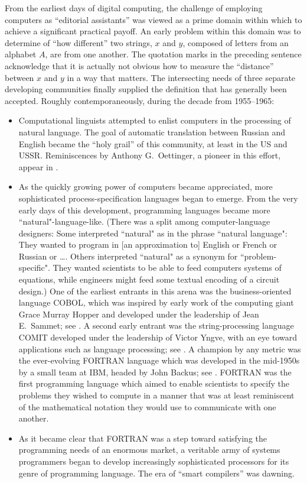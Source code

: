 From the earliest days of digital computing, the challenge of employing computers as ``editorial assistants'' was viewed as a prime domain within which to achieve a significant practical payoff.  An early problem within this domain was to determine of ``how different'' two strings, $x$ and $y$, composed of letters from an alphabet $A$, are from one another.  The quotation marks in the preceding sentence acknowledge that it is actually not obvious how to measure the ``distance'' between $x$ and $y$ in a way that matters.  The intersecting needs of three separate developing communities finally supplied the definition that has generally been accepted.  Roughly contemporaneously, during the decade from 1955--1965:
  
 
  \begin{itemize}
  \item
Computational linguists attempted to enlist computers in the processing of natural language.  The goal of automatic translation between Russian and English became the ``holy grail'' of this community, at least in the US and USSR.  Reminiscences by Anthony G.~Oettinger,  a pioneer in this effort, appear in \cite{Hutchins00}.
   \item
As the quickly growing power of computers became appreciated, more sophisticated process-specification languages began to emerge.  From the very early days of this development, programming languages became more ``natural"-language-like.  (There was a split among computer-language designers:  Some interpreted ``natural" as in the phrase ``natural language":  They wanted to program in [an approximation to] English or French or Russian or \ldots.  Others interpreted ``natural" as a synonym for ``problem-specific".  They wanted scientists to be able to feed computers systems of equations, while engineers might feed some textual encoding of a circuit design.) One of the earliest entrants in this arena was the business-oriented language COBOL, which was inspired by early work of the computing giant Grace Murray Hopper and developed under the leadership of Jean E.~Sammet; see \cite{Sammet78}.  A second early entrant was the string-processing language COMIT developed under the leadership of Victor Yngve, with an eye toward applications such as language processing; see \cite{Yngve}.  A champion by any metric was the ever-evolving FORTRAN language which was developed in the mid-1950s by a small team at IBM, headed by John Backus; see \cite{Backus-etal57}.  FORTRAN was the first programming language which aimed to enable scientists to specify the problems they wished to compute in a manner that was at least reminiscent of the mathematical notation they would use to communicate with one another.
   \item
As it became clear that FORTRAN was a step toward satisfying the programming needs of an enormous market, a veritable army of systems programmers began to develop increasingly sophisticated processors for its genre of programming language.  The era of ``smart compilers'' was dawning.
   \end{itemize}

